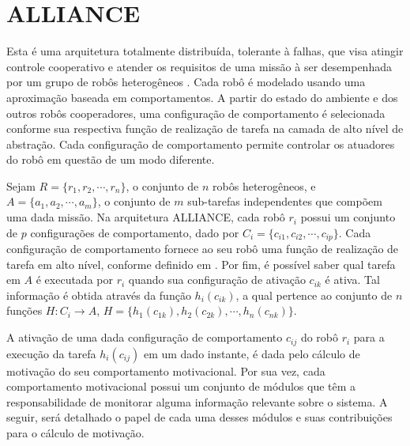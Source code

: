             
        
        
        
        
        
        
        
        
        
        
        
        
        
        
        
    \section{ALLIANCE} \label{sec:alliance}
        Esta é uma arquitetura totalmente distribuída, tolerante à falhas, que visa atingir controle cooperativo e atender os requisitos de uma missão à ser desempenhada por um grupo de robôs heterogêneos \cite{ref:parker1998alliance}. Cada robô é modelado usando uma aproximação baseada em comportamentos. A partir do estado do ambiente e dos outros robôs cooperadores, uma configuração de comportamento é selecionada conforme sua respectiva função de realização de tarefa na camada de alto nível de abstração. Cada configuração de comportamento permite controlar os atuadores do robô em questão de um modo diferente.
        
        Sejam $R=\{r_1, r_2, \cdots, r_n\}$, o conjunto de $n$ robôs heterogêneos, e $A=\{a_1,a_2, \cdots,\allowbreak a_m\}$, o conjunto de $m$ sub-tarefas independentes que compõem uma dada missão. Na arquitetura ALLIANCE, cada robô $r_i$ possui um conjunto de $p$ configurações de comportamento, dado por $C_i=\{c_{i1}, c_{i2},\cdots, c_{ip}\}$. Cada configuração de comportamento fornece ao seu robô uma função de realização de tarefa em alto nível, conforme definido em \cite{ref:brooks1986robust}. Por fim, é possível saber qual tarefa em $A$ é executada por $r_i$ quando sua configuração de ativação $c_{ik}$ é ativa. Tal informação é obtida através da função $h_i(c_{ik})$, a qual pertence ao conjunto de $n$ funções $H : C_i \to A$, $H = \{h_1(c_{1k}),\allowbreak h_2(c_{2k}), \cdots, h_n(c_{nk})\}$.
        
        A ativação de uma dada configuração de comportamento $c_{ij}$ do robô $r_i$ para a execução da tarefa $h_i(c_{ij})$ em um dado instante, é dada pelo cálculo de motivação do seu comportamento motivacional. Por sua vez, cada comportamento motivacional possui um conjunto de módulos que têm a responsabilidade de monitorar alguma informação relevante sobre o sistema. A seguir, será detalhado o papel de cada uma desses módulos e suas contribuições para o cálculo de motivação.
        
